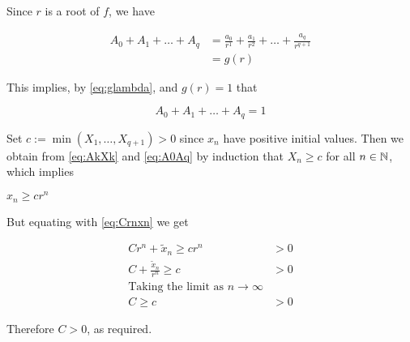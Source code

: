 \begin{theorem}
\begin{pf}
\begin{enumerate}[(a)]
Since $r$ is a root of $f$, we have

\begin{align}
  A_0+A_1+\dots+A_q &= \frac{a_0}{r^{1}}+\frac{a_1}{r^{2}}+\dots+\frac{a_q}{r^{q+1}} \nonumber \\ 
                     &= g(r) \nonumber 
\end{align}

This implies, by \ref{eq:glambda}, and $g(r)=1$ that 

\begin{equation}
     A_0+A_1+\dots+A_q = 1 \label{eq:A0Aq}
\end{equation}

Set $c := \min(X_1, \dots , X_{q+1}) > 0$ since $x_n$ have positive initial values. Then we obtain from \ref{eq:AkXk} and \ref{eq:A0Aq} by induction that
$X_n \geq c$ for all $n \in \mathbb N$, which implies

$x_n\geq cr^n$

But equating with \ref{eq:Crnxn} we get

\begin{align}
      Cr^n + \tilde{x}_n   \geq cr^n &> 0  \nonumber\\
    C +\frac{\tilde{x}_n}{r^n}    \geq c &> 0 \nonumber \\
  \text{Taking the limit as } n\to\infty \nonumber \\
   C \geq c &> 0
\end{align}

Therefore $C>0$, as required.
\end{enumerate}
\end{pf}
\end{theorem}

